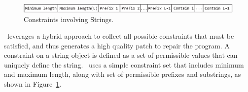 %
\begin{figure}[t]
\centering
\includegraphics[width=\linewidth]{images/constraint.eps}
\caption{Constraints involving Strings.}
\label{fig:constraint}
\end{figure}
% 

 \tool\ leverages a hybrid
approach to collect all possible constraints that must be satisfied, and thus
generates a high quality patch to repair the program. A constraint on a string
object is defined as a set of permissible values that can uniquely define the
string. \tool\ uses a simple constraint set that includes minimum and maximum
length, along with set of permissible prefixes and substrings, as shown in
Figure~\ref{fig:constraint}.

